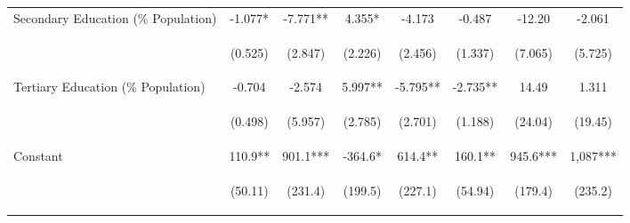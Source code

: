 \begin{subtables}
\begin{landscape}
\begin{table}[htpb!]
\begin{center}
\begin{tabular}{lccccccc}
Secondary Education (\% Population) &-1.077*&-7.771**&4.355*&-4.173&-0.487&-12.20&-2.061\\
&\begin{footnotesize}(0.525)\end{footnotesize}&\begin{footnotesize}(2.847)\end{footnotesize}&\begin{footnotesize}(2.226)\end{footnotesize}&\begin{footnotesize}(2.456)\end{footnotesize}&\begin{footnotesize}(1.337)\end{footnotesize}&\begin{footnotesize}(7.065)\end{footnotesize}&\begin{footnotesize}(5.725)\end{footnotesize}\\
Tertiary Education (\% Population) &-0.704&-2.574&5.997**&-5.795**&-2.735**&14.49&1.311\\
&\begin{footnotesize}(0.498)\end{footnotesize}&\begin{footnotesize}(5.957)\end{footnotesize}&\begin{footnotesize}(2.785)\end{footnotesize}&\begin{footnotesize}(2.701)\end{footnotesize}&\begin{footnotesize}(1.188)\end{footnotesize}&\begin{footnotesize}(24.04)\end{footnotesize}&\begin{footnotesize}(19.45)\end{footnotesize}\\
Constant&110.9**&901.1***&-364.6*&614.4**&160.1**&945.6***&1,087***\\
&\begin{footnotesize}(50.11)\end{footnotesize}&\begin{footnotesize}(231.4)\end{footnotesize}&\begin{footnotesize}(199.5)\end{footnotesize}&\begin{footnotesize}(227.1)\end{footnotesize}&\begin{footnotesize}(54.94)\end{footnotesize}&\begin{footnotesize}(179.4)\end{footnotesize}&\begin{footnotesize}(235.2)\end{footnotesize}\\

\end{tabular}
\end{center}
\end{table}
\end{landscape}
\end{subtables}
